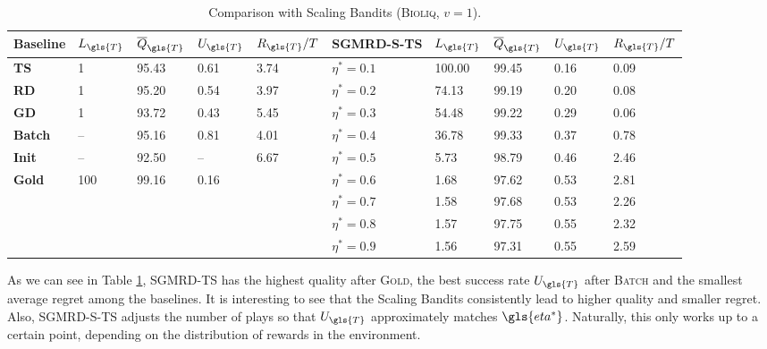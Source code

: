 \begin{table}
	\renewrobustcmd{\boldmath}{}
	\centering
	\caption{Comparison with Scaling Bandits (\textsc{Bioliq}, $v=1$).}
	\label{result:sgmrd_scaling}
	\addtolength{\tabcolsep}{-2.5pt}
	\centering
	\footnotesize
	\renewcommand{\arraystretch}{0.68}
	\begin{tabularx}{\textwidth}{@{}lXXXX|lXXXX@{}}
		\toprule
		\textbf{Baseline} & \textbf{$L_{\gls{T}}$} & \textbf{$\overline{Q}_{\gls{T}}$} & \textbf{$U_{\gls{T}}$} & \textbf{$R_{\gls{T}}/T$} & \textbf{\gls{SGMRD}-\gls{S-TS}} & \textbf{$L_{\gls{T}}$} & \textbf{$\overline{Q}_{\gls{T}}$} & \textbf{$U_{\gls{T}}$}  & \textbf{$R_{\gls{T}}/T$}  \\ \midrule
		\textbf{\gls{TS}}    & 1     & 95.43       & 0.61    &  3.74   & $\eta^*=0.1$         & 100.00 	  & 99.45 	    & 0.16  &  0.09   \\
		\textbf{RD}    & 1           & 95.20       & 0.54    &  3.97   & $\eta^*=0.2$         & 74.13 	  & 99.19 	    & 0.20  &  0.08   \\
		\textbf{GD}    & 1           & 93.72       & 0.43    &  5.45   & $\eta^*=0.3$         & 54.48 	  & 99.22 	    & 0.29  &  0.06    \\
		\textbf{Batch} & --          & 95.16       & 0.81    &  4.01   & $\eta^*=0.4$         & 36.78 	  & 99.33 	    & 0.37  &  0.78    \\
		\textbf{Init}  & --          & 92.50       & --       &  6.67   & $\eta^*=0.5$         & 5.73 	  & 98.79 	    & 0.46  &  2.46     \\
		\textbf{Gold}   & 100         & 99.16       & 0.16    &   & $\eta^*=0.6$         & 1.68 	  & 97.62 	    & 0.53  &  2.81   \\
		&          &          &         					  &   & $\eta^*=0.7$         & 1.58       & 97.68 	    & 0.53  &  2.26   \\
		&          &          &         					  &	  & $\eta^*=0.8$         & 1.57 	  & 97.75 	    & 0.55  &  2.32    \\
		&          &          &         					  &   & $\eta^*=0.9$         & 1.56 	  & 97.31 	    & 0.55  &  2.59    \\ \bottomrule
	\end{tabularx}
\end{table}

As we can see in Table \ref{result:sgmrd_scaling}, \textsc{\gls{SGMRD}-\gls{TS}} has the highest quality after \textsc{Gold}, the best success rate $U_{\gls{T}}$ after \textsc{Batch} and the smallest average regret among the baselines. It is interesting to see that the Scaling Bandits consistently lead to higher quality and smaller regret. Also, \textsc{\gls{SGMRD}-\gls{S-TS}} adjusts the number of plays so that $U_{\gls{T}}$ approximately matches $\gls{eta^*}$. Naturally, this only works up to a certain point, depending on the distribution of rewards in the environment. %

